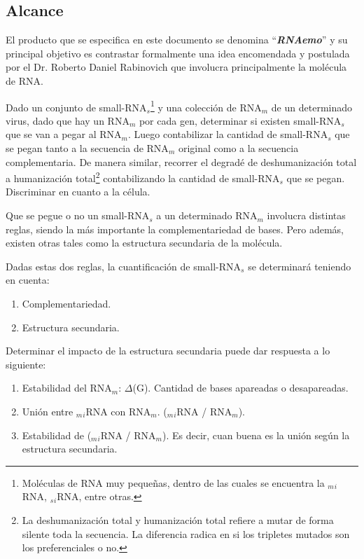 \documentclass[12pt,a4paper,english,spanish]{article}
\newcommand{\rnaemo}{\textbf{\emph{RNAemo}}}
\begin{document}
\subsection{Alcance}
\par El producto que se especifica en este documento se denomina ``\rnaemo''
 y su principal objetivo es contrastar formalmente una idea encomendada y
postulada por el Dr. Roberto Daniel Rabinovich que involucra principalmente 
la molécula de RNA. 
\par Dado un conjunto de small-RNA$_s$\footnote{Moléculas de RNA muy pequeñas, 
dentro de las cuales se encuentra la $_m$$_i$RNA, $_s$$_i$RNA, entre otras.} y
 una colección de RNA$_m$ de un determinado virus, dado que hay un RNA$_m$ por
 cada gen, determinar si existen small-RNA$_s$ que se van a pegar al RNA$_m$. 
Luego contabilizar la cantidad de small-RNA$_s$ que se pegan tanto a la secuencia
 de RNA$_m$ original como a la secuencia complementaria. De manera similar, recorrer 
el degradé de deshumanización total a humanización total\footnote{La deshumanización total
 y humanización total refiere a mutar de forma silente toda la secuencia. La diferencia radica
 en si los tripletes mutados son los preferenciales o no.} contabilizando la cantidad 
de small-RNA$_s$ que se pegan. Discriminar en cuanto a la célula.
\par Que se pegue o no un small-RNA$_s$ a un determinado RNA$_m$ involucra distintas
 reglas, siendo la más importante la complementariedad de bases. Pero además, existen 
otras tales como la estructura secundaria de la molécula.

\par Dadas estas dos reglas, la cuantificación de small-RNA$_s$ se determinará teniendo en cuenta:
\begin{enumerate}
	\item Complementariedad.
	\item Estructura secundaria.
\end{enumerate}

Determinar el impacto de la estructura secundaria puede dar respuesta a lo siguiente:
\begin{enumerate}
	\item Estabilidad del RNA$_m$: $\Delta$(G). Cantidad de bases apareadas o desapareadas.
	\item Unión entre $_m$$_i$RNA con RNA$_m$. ($_m$$_i$RNA / RNA$_m$).
	\item Estabilidad de ($_m$$_i$RNA / RNA$_m$). Es decir, cuan buena es la unión según la estructura secundaria.
\end{enumerate}
\end{document}
